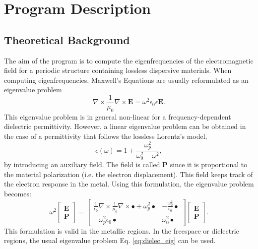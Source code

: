 \documentclass[11pt,a4paper,oneside]{article}
\begin{document}
\section{Program Description}

\subsection{Theoretical Background}
The aim of the program is to compute the eigenfrequencies of the electromagnetic field for a periodic structure containing lossless dispersive materials. When computing eigenfrequencies, Maxwell's Equations are usually reformulated as an eigenvalue problem
\begin{equation}
\nabla \times \frac{1}{\mu_0} \nabla \times \boldsymbol{E} = \omega^2 \epsilon_0 \epsilon \boldsymbol{E}.
\label{eq:dielec_eig}
\end{equation}
This eigenvalue problem is in general non-linear for a frequency-dependent dielectric permittivity. However, a linear eigenvalue problem can be obtained in the case of a permittivity that follows the lossless Lorentz's model,
\begin{equation}
\epsilon(\omega)=1+\frac{\omega_{p}^{2}}{\omega_{0}^{2}-\omega^{2}},
\end{equation}
by introducing an auxiliary field. The field is called {\bf P} since it is proportional to the material polarization (i.e. the electron displacement). This field keeps track of the electron response in the metal. Using this formulation, the eigenvalue problem becomes:
\begin{equation}
\omega^{2}\left[
\begin{array}{c}
\boldsymbol{E}\\
\boldsymbol{P}
\end{array}
\right]=\left[
\begin{array}{cc}
\frac{1}{\epsilon_{0}}\nabla\times\frac{1}{\mu_{0}}\nabla\times\bullet+\omega_{p}^{2}\bullet & -\frac{\omega_{0}^{2}}{\epsilon_{0}}\bullet\\
-\omega_{p}^{2}\epsilon_{0}\bullet & \omega_{0}^{2}\bullet
\end{array}
\right]\left[
\begin{array}{c}
\boldsymbol{E}\\
\boldsymbol{P}
\end{array}
\right].
\label{eq:2_fields}
\end{equation}
This formulation is valid in the metallic regions. In the freespace or dielectric regions, the usual eigenvalue problem Eq. \eqref{eq:dielec_eig} can be used.
\end{document}
